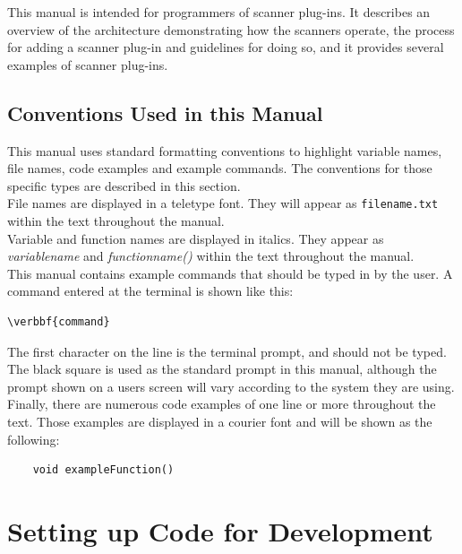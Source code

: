 \documentclass[11pt,fleqn]{article} %
\begin{document}
This manual is intended for programmers of \bulk scanner plug-ins. It describes an overview of the \bulk architecture demonstrating how the scanners operate, the process for adding a scanner plug-in and guidelines for doing so, and it provides several examples of \bulk scanner plug-ins.

\subsection{Conventions Used in this Manual}
This manual uses standard formatting conventions to highlight variable names, file names, code examples and example commands. The conventions for those specific types are described in this section. \\

File names are displayed in a teletype font. They will appear as \texttt{filename.txt} within the text throughout the manual.\\

Variable and function names are displayed in italics. They appear as \textit{variablename} and \textit{functionname()} within the text throughout the manual.\\

This manual contains example commands that should be typed in by the user. A command entered at the terminal is shown like this: \begin{Verbatim}[commandchars=\\\{\}]
\verbbf{command}
\end{Verbatim}
The first character on the line is the terminal prompt, and should not be typed. The black square is used as the standard prompt in this manual, although the prompt shown on a users screen will vary according to the system they are using.\\

Finally, there are numerous code examples of one line or more throughout the text. Those examples are displayed in a courier font and will be shown as the following: 
\lstset{style=codelisting}
\begin{lstlisting}
	void exampleFunction()
\end{lstlisting}



\section{Setting up Code for Development}
\end{document}
